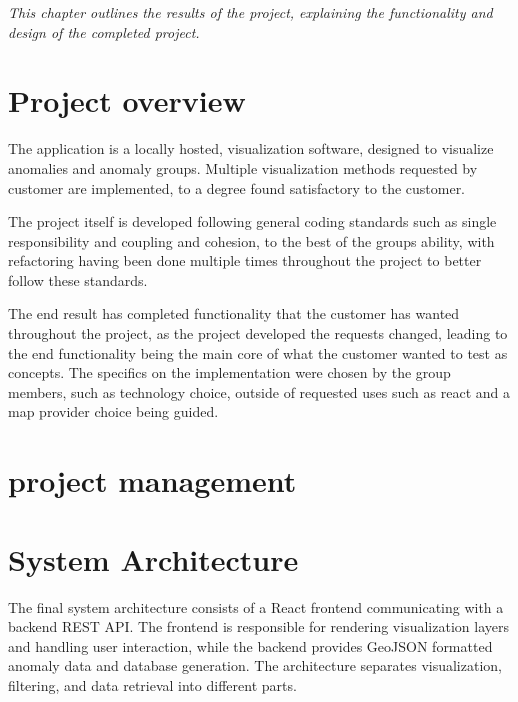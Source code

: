 

\textit{This chapter outlines the results of the project, explaining the functionality and design of the completed project.}


\section{Project overview}

The application is a locally hosted, visualization software, designed to visualize anomalies and anomaly groups. Multiple visualization methods requested by customer are implemented, to a degree found satisfactory to the customer. 

The project itself is developed following general coding standards such as single responsibility and coupling and cohesion, to the best of the groups ability, with refactoring having been done multiple times throughout the project to better follow these standards. 

The end result has completed functionality that the customer has wanted throughout the project, as the project developed the requests changed, leading to the end functionality being the main core of what the customer wanted to test as concepts. The specifics on the implementation were chosen by the group members, such as technology choice, outside of requested uses such as react and a map provider choice being guided.  


\newpage
\section{project management}


\section{System Architecture}

The final system architecture consists of a React frontend communicating with a backend REST API. The frontend is responsible for rendering visualization layers and handling user interaction, while the backend provides GeoJSON formatted anomaly data and database generation. The architecture separates visualization, filtering, and data retrieval into different parts. 
 
